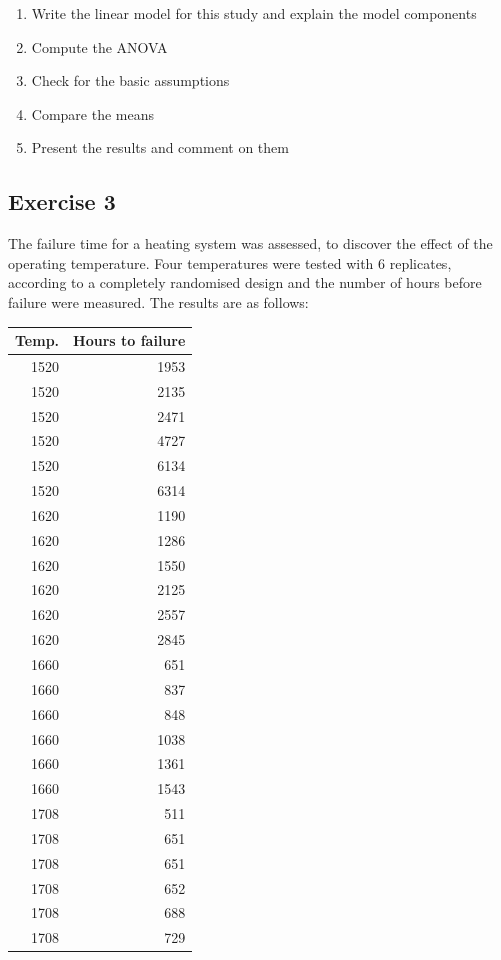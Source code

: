 \documentclass[a4paper,12pt,oneside]{book}
\providecommand{\tightlist}{%
  \setlength{\itemsep}{0pt}\setlength{\parskip}{0pt}}
\begin{document}
\begin{enumerate}
\def\labelenumi{\arabic{enumi}.}
\tightlist
\item
  Write the linear model for this study and explain the model components
\item
  Compute the ANOVA
\item
  Check for the basic assumptions
\item
  Compare the means
\item
  Present the results and comment on them
\end{enumerate}

\hypertarget{exercise-3-3}{%
\subsection{Exercise 3}\label{exercise-3-3}}

The failure time for a heating system was assessed, to discover the effect of the operating temperature. Four temperatures were tested with 6 replicates, according to a completely randomised design and the number of hours before failure were measured.
The results are as follows:

\begin{longtable}[]{@{}rr@{}}
\toprule
Temp. & Hours to failure \\
\midrule
\endhead
1520 & 1953 \\
1520 & 2135 \\
1520 & 2471 \\
1520 & 4727 \\
1520 & 6134 \\
1520 & 6314 \\
1620 & 1190 \\
1620 & 1286 \\
1620 & 1550 \\
1620 & 2125 \\
1620 & 2557 \\
1620 & 2845 \\
1660 & 651 \\
1660 & 837 \\
1660 & 848 \\
1660 & 1038 \\
1660 & 1361 \\
1660 & 1543 \\
1708 & 511 \\
1708 & 651 \\
1708 & 651 \\
1708 & 652 \\
1708 & 688 \\
1708 & 729 \\
\bottomrule
\end{longtable}
\end{document}
